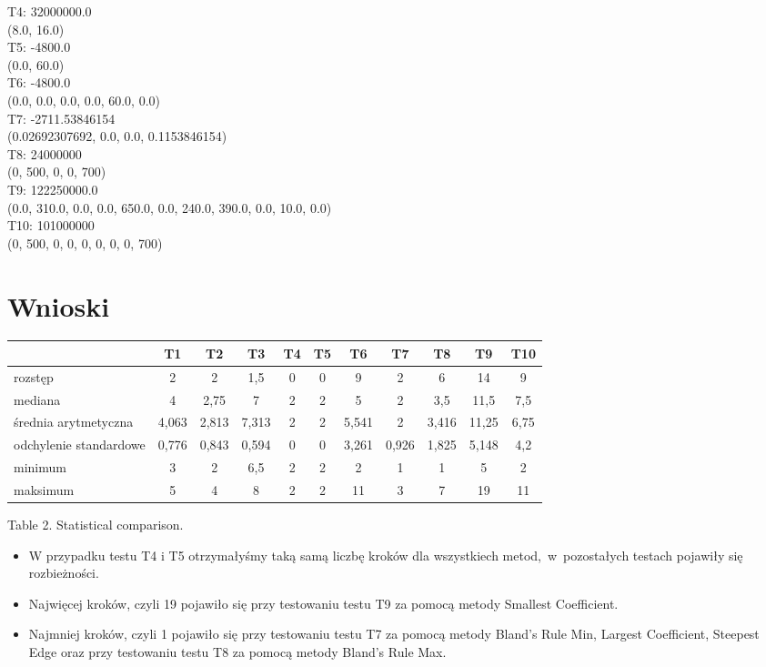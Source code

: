 \documentclass[a4paper]{article}
\begin{document}
\textcolor{green!40}{T4}: 32000000.0\\
(8.0, 16.0)\\
\textcolor{green!40}{T5}: -4800.0\\
(0.0, 60.0)\\
\textcolor{green!40}{T6}: -4800.0\\
(0.0, 0.0, 0.0, 0.0, 60.0, 0.0)\\
\textcolor{green!40}{T7}: -2711.53846154\\
(0.02692307692, 0.0, 0.0, 0.1153846154)\\
\textcolor{green!40}{T8}: 24000000\\
(0, 500, 0, 0, 700)\\
\textcolor{green!40}{T9}: 122250000.0\\
(0.0, 310.0, 0.0, 0.0, 650.0, 0.0, 240.0, 390.0, 0.0, 10.0, 0.0)\\
\textcolor{green!40}{T10}: 101000000\\
(0, 500, 0, 0, 0, 0, 0, 0, 700)

\section{Wnioski}
\vspace{0.05in}

\begin{tabular}{l|c|c|c|c|c|c|c|c|c|c|}
 & T1 & T2 & T3 & T4 &  T5 &  T6 &  T7 &  T8 & T9 & T10\\\hline
rozstęp & 2 & 2 & 1,5 & 0 & 0 & 9 & 2 & 6 & 14 & 9\\
mediana & 4 & 2,75 & 7 & 2 &  2 & 5 & 2 & 3,5 & 11,5 & 7,5\\ 
średnia arytmetyczna & 4,063 & 2,813 & 7,313 & 2 & 2 & 5,541 & 2 & 3,416 & 11,25 & 6,75\\
odchylenie standardowe & 0,776 & 0,843 & 0,594 & 0 &  0 & 3,261 & 0,926 & 1,825 & 5,148 & 4,2\\
minimum & 3 & 2 & 6,5 & 2 & 2 & 2 & 1 & 1 & 5 & 2\\
maksimum & 5 & 4 & 8 & 2 & 2 & 11 & 3 & 7 & 19 & 11\\
\end{tabular}
\vspace{0.05in}
\begin{center}
Table 2. Statistical comparison.
\end{center}


\begin{itemize}
\item W przypadku testu T4 i T5 otrzymałyśmy taką samą liczbę kroków dla wszystkiech metod,~w~pozostałych testach pojawiły się rozbieżności.
\item Najwięcej kroków, czyli 19 pojawiło się przy testowaniu testu T9 za pomocą metody Smallest Coefficient.
\item Najmniej kroków, czyli 1 pojawiło się przy testowaniu testu T7 za pomocą metody Bland's Rule Min, Largest Coefficient, Steepest Edge oraz przy testowaniu testu T8 za pomocą metody Bland's Rule Max.
\end{itemize}
\end{document}
